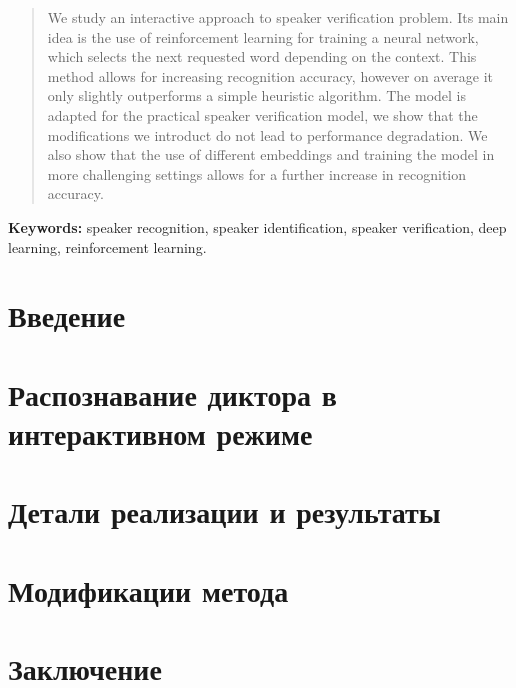 \documentclass[14pt]{spbau-diploma}
\begin{document}
\begin{otherlanguage}{english}
\begin{abstract}
    We study an interactive approach to speaker verification problem. Its main
    idea is the use of reinforcement learning for training a neural network,
    which selects the next requested word depending on the context. This method
    allows for increasing recognition accuracy, however on average it only
    slightly outperforms a simple heuristic algorithm. The model is adapted for
    the practical speaker verification model, we show that the modifications we
    introduct do not lead to performance degradation. We also show that the use
    of different embeddings and training the model in more challenging settings
    allows for a further increase in recognition accuracy.
\end{abstract}
\end{otherlanguage}

\textbf{Keywords:} speaker recognition, speaker identification, speaker
verification, deep learning, reinforcement learning.

\newpage
\tableofcontents

\newpage
\section*{Введение}\label{sec:intro}



\newpage
\section{Распознавание диктора в интерактивном режиме}\label{sec:theory}



\newpage
\section{Детали реализации и результаты}\label{sec:experiments}



\newpage
\section{Модификации метода}\label{sec:modifications}



\newpage
\section*{Заключение}





\end{document}
